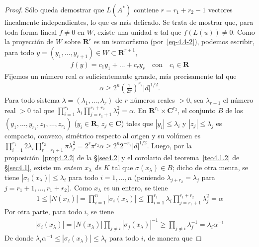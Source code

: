 \documentclass[10pt,oneside,bibtotoc,smallheadings,leqno,a5paper,DIV=12]{scrbook}
\newcommand{\RR}{\mathbf{R}}
\newcommand{\CC}{\mathbf{C}}
\newcommand{\abs}[1]{\left\lvert#1\right\rvert}
\numberwithin{equation}{section}
\theoremstyle{defi}
\theoremstyle{enonce}
\theoremstyle{rem}
\numberwithin{theorem}{section}
\numberwithin{proposition}{section}
\numberwithin{definition}{section}
\numberwithin{lemma}{section}
\numberwithin{corollary}{section}
\numberwithin{example}{section}
\numberwithin{footnote}{section}%
\begin{document}
\begin{proof}
S\'olo queda demostrar que $L(A^{*})$ contiene $r = r_{1}+r_{2}-1$ vectores linealmente independientes,
lo que es m\'as delicado. Se trata de mostrar que, para toda forma lineal $f\neq 0$ en $W$, existe una unidad
$u$ tal que $f(L(u))\neq 0$. Como la proyecci\'on de $W$ sobre $\RR^{r}$ es un isomorfismo
(por~\eqref{eq-4.4-2}), podemos escribir, para todo $y=(y_{1},\dots,y_{r+1})\in W\subset\RR^{r+1}$,
\begin{gather}\label{eq-4.4-3}
f(y) = c_{1}y_{1}+\dots+c_{r}y_{r}\quad\text{con}\quad c_{i}\in\RR
\end{gather}
Fijemos un n\'umero real $\alpha$ suficientemente grande, m\'as precisamente tal que
\begin{gather*}
\alpha\geq 2^{n}\left(\frac{1}{2\pi}\right)^{r_{2}}\abs{d}^{1/2}.
\end{gather*}
Para todo sistema $\lambda = (\lambda_{1},\dots,\lambda_{r})$ de $r$ n\'umeros reales $>0$, sea
$\lambda_{r+1}$ el n\'umero real $>0$ tal que $\prod_{i=1}^{r_{1}}\lambda_{i}\prod_{j=r_{1}+1}^{r_{1}+r_{2}}\lambda_{j}^{2}=\alpha$.
En $\RR^{r_{1}}\times\CC^{r_{2}}$, el conjunto $B$ de los $(y_{1},\dots,y_{r_{1}},z_{1},\dots,z_{r_{2}})$
($y_{i}\in\RR$, $z_{j}\in\CC$) tales que $\abs{y_{i}}\leq\lambda_{i}$ y $\abs{z_{j}}\leq\lambda_{j}$
es compacto, convexo, sim\'etrico respecto al origen y su vol\'umen es $\prod_{i=1}^{r_{1}}2\lambda_{i}
\prod_{r=r_{1}+1}^{r_{2}}\pi\lambda_{j}^{2}=2^{r}\pi^{r_{2}}\alpha\geq 2^{n}2^{-r_{2}}\abs{d}^{1/2}$.
Luego, por la proposici\'on~\ref{prop4.2.2} de la \S\ref{sec4.2} y
el corolario del teorema~\ref{teo4.1.2} de \S\ref{sec4.1}, existe un {\em entero $x_{\lambda}$
de $K$} tal que $\sigma(x_{\lambda})\in B$; dicho de otra menra, se tiene $\abs{\sigma_{i}(x_{\lambda})}
\leq\lambda_{i}$ para todo $i=1,\dots,n$ (poniendo $\lambda_{j+r_{2}}=\lambda_{j}$ para $j=r_{1}+1,\dots,r_{1}+r_{2}$).
Como $x_{\lambda}$ es un entero, se tiene
\begin{gather*}
1\leq\abs{N(x_{\lambda})}=\prod_{i=1}^{n}\abs{\sigma_{i}(x_{\lambda})}\leq\prod_{i=1}^{r_{1}}\lambda_{i}
\prod_{j=r_{1}+1}^{r_{1}+r_{2}}\lambda_{j}^{2}=\alpha
\end{gather*}
Por otra parte, para todo $i$, se tiene
\begin{gather*}
\abs{\sigma_{i}(x_{\lambda})}=\abs{N(x_{\lambda})}\prod_{j\neq i}\abs{\sigma_{j}(x_{\lambda})}^{-1}
\geq\prod_{j\neq i}\lambda_{j}^{-1}=\lambda_{i}\alpha^{-1}
\end{gather*}
De donde $\lambda_{i}\alpha^{-1}\leq\abs{\sigma_{i}(x_{\lambda})}\leq\lambda_{i}$ para todo $i$, de manera que

\end{proof}
\end{document}
